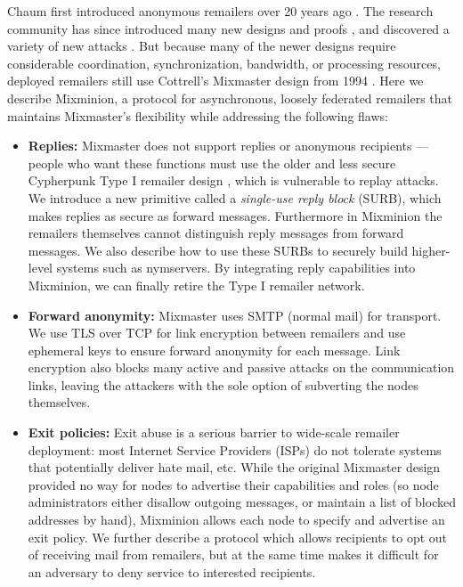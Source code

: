\documentclass[final,inpress,inline]{ieee}
\begin{document}
Chaum first introduced anonymous remailers over 20 years ago
\cite{chaum-mix}.
The research community has since introduced many new
designs and proofs
\cite{abe}\cite{babel}\cite{flash-mix}\cite{kesdogan}\cite{shuffle}\cite{hybrid-mix}, 
and discovered a variety of new attacks 
\cite{back-traffic-analysis}\cite{langos02}\cite{disad-free-routes}\cite{desmedt}\cite{mitkuro}\cite{raymond00}.
But because many of the newer designs require considerable coordination,
synchronization, bandwidth, or processing resources, deployed remailers still use
Cottrell's Mixmaster design from 1994
\cite{mixmaster-attacks}\cite{mixmaster-spec}. Here we describe Mixminion, a
protocol for asynchronous, loosely federated remailers that maintains
Mixmaster's flexibility while addressing the following flaws:

\begin{itemize}
\item \textbf{Replies:} Mixmaster does not support replies or anonymous
recipients --- people who want these functions must use the older and less
secure Cypherpunk Type I remailer design \cite{remailer-history}, which is
vulnerable to replay attacks. We introduce a new primitive called a
\emph{single-use reply block} (SURB), which makes replies as secure as
forward messages. Furthermore in Mixminion the remailers
themselves cannot distinguish reply messages from forward messages. We also
describe how to use these SURBs to securely build higher-level systems such as
nymservers. By integrating reply capabilities into Mixminion, we can finally
retire the Type I remailer network.

\item \textbf{Forward anonymity:} Mixmaster uses SMTP (normal mail) for
transport. We use TLS over TCP for link encryption between remailers
and use ephemeral keys to ensure forward anonymity for
each message. Link encryption also blocks many active and
passive attacks on the communication links, leaving the attackers with
the sole option of subverting the nodes themselves.


\item \textbf{Exit policies:} Exit abuse is a serious barrier to wide-scale
remailer deployment: most Internet Service Providers (ISPs) do not
tolerate systems that potentially 
deliver hate mail, etc. While the original Mixmaster design provided no
way for nodes to advertise their capabilities and roles (so node
administrators either disallow outgoing messages, or maintain a list of
blocked addresses by hand), 
Mixminion allows each node to specify and advertise an exit policy. We
further describe a protocol which allows recipients to opt out of receiving mail
from remailers, but at the same time makes it difficult for an adversary
to deny service to interested recipients.


\end{itemize}
\end{document}
